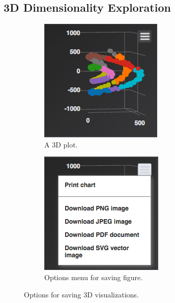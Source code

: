 \documentclass{sigchi}
\begin{document}
\subsection{3D Dimensionality Exploration}%
%
\begin{figure}
\centering
\begin{subfigure}{.49\columnwidth}
  \centering
  \includegraphics[width=.95\columnwidth]{figures/preclick3d}
  \caption{A 3D plot.}
\end{subfigure}%
\begin{subfigure}{.49\columnwidth}
  \centering
  \includegraphics[width=.96\columnwidth]{figures/postclick3d}
  \caption{Options menu for saving figure.}
\end{subfigure}
\caption{Options for saving 3D visualizations.}
\label{fig:double}
\end{figure}%
\end{document}
